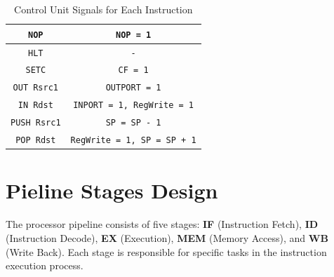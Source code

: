 \documentclass{report}
\begin{document}
\begin{table}[H]
\begin{tabular}{|c|c|}
    \texttt{NOP} & \texttt{NOP = 1} \\ \hline
    \texttt{HLT} & \texttt{-} \\ \hline
    \texttt{SETC} & \texttt{CF = 1} \\ \hline
    \texttt{OUT Rsrc1} & \texttt{OUTPORT = 1} \\ \hline
    \texttt{IN Rdst} & \texttt{INPORT = 1, RegWrite = 1} \\ \hline
    \texttt{PUSH Rsrc1} & \texttt{SP = SP - 1} \\ \hline
    \texttt{POP Rdst} & \texttt{RegWrite = 1, SP = SP + 1} \\ \hline
    \end{tabular}
    \caption{Control Unit Signals for Each Instruction}
    \label{tab:cu-signals}
\end{table}


\chapter{Pieline Stages Design}
The processor pipeline consists of five stages:
\textbf{IF} (Instruction Fetch),
\textbf{ID} (Instruction Decode),
\textbf{EX} (Execution),
\textbf{MEM} (Memory Access), and
\textbf{WB} (Write Back).
Each stage is responsible for specific tasks in the instruction execution process.
\end{document}
